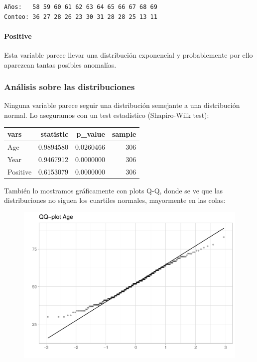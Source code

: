 \begin{verbatim}
Años:   58 59 60 61 62 63 64 65 66 67 68 69 
Conteo: 36 27 28 26 23 30 31 28 28 25 13 11 
\end{verbatim}


\paragraph{Positive}
Esta variable parece llevar una distribución exponencial y probablemente por ello aparezcan tantas posibles anomalías.

\subsubsection{Análisis sobre las distribuciones}

Ninguna variable parece seguir una distribución semejante a una distribución normal. Lo aseguramos con un test estadístico (Shapiro-Wilk test):
\vspace{\baselineskip}

\begin{tabular}{l|r|r|r}
\hline
vars & statistic & p\_value & sample\\
\hline
Age & 0.9894580 & 0.0260466 & 306\\
\hline
Year & 0.9467912 & 0.0000000 & 306\\
\hline
Positive & 0.6153079 & 0.0000000 & 306\\
\hline
\end{tabular}

\vspace{\baselineskip}

También lo mostramos gráficamente con plots Q-Q, donde se ve que las distribuciones no siguen los cuartiles normales, mayormente en las colas:
\begin{figure}[H]\includegraphics[width=.9\linewidth]{img/EDA2_files/figure-latex/unnamed-chunk-18-1} \caption{}\end{figure}

